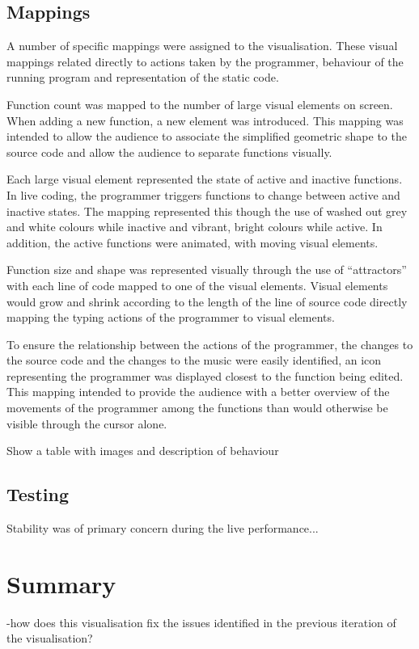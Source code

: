 \subsection{Mappings}

A number of specific mappings were assigned to the visualisation. These visual mappings related directly to actions taken by the programmer, behaviour of the running program and representation of the static code. 

Function count was mapped to the number of large visual elements on screen. When adding a new function, a new element was introduced. This mapping was intended to allow the audience to associate the simplified geometric shape to the source code and allow the audience to separate functions visually.

Each large visual element represented the state of active and inactive functions. In live coding, the programmer triggers functions to change between active and inactive states. The mapping represented this though the use of washed out grey and white colours while inactive and vibrant, bright colours while active. In addition, the active functions were animated, with moving visual elements.

Function size and shape was represented visually through the use of ``attractors'' with each line of code mapped to one of the visual elements. Visual elements would grow and shrink according to the length of the line of source code directly mapping the typing actions of the programmer to visual elements.  


To ensure the relationship between the actions of the programmer, the changes to the source code and the changes to the music were easily identified, an icon representing the programmer was displayed closest to the function being edited. This mapping intended to provide the audience with a better overview of the movements of the programmer among the functions than would otherwise be visible through the cursor alone.  

{\color{red} Show a table with images and description of behaviour}

\subsection{Testing}

Stability was of primary concern during the live performance...

\section{Summary}

-how does this visualisation fix the issues identified in the previous iteration of the visualisation?

\more


